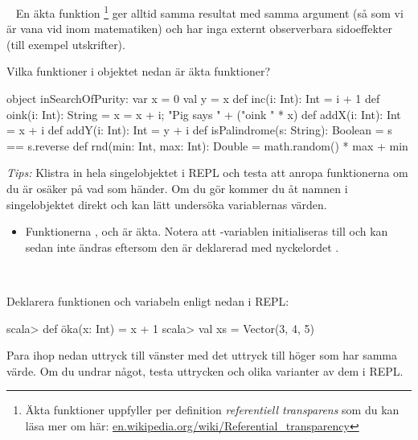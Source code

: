 
\QUESTBEGIN

\Task  \what~  En äkta funktion%
\footnote{Äkta funktioner uppfyller per definition  \textit{referentiell transparens}  som du kan läsa mer om här:  \href{https://en.wikipedia.org/wiki/Referential_transparency}{en.wikipedia.org/wiki/Referential\_transparency}}
 ger alltid samma resultat med samma argument (så som vi är vana vid inom matematiken) och har inga externt observerbara sidoeffekter (till exempel utskrifter).

Vilka funktioner i objektet  nedan är äkta funktioner?
\begin{Code}
object inSearchOfPurity:
  var x = 0
  val y = x
  def inc(i: Int): Int = i + 1
  def oink(i: Int): String = { x = x + i; "Pig says " + ("oink " * x) }
  def addX(i: Int): Int = x + i
  def addY(i: Int): Int = y + i
  def isPalindrome(s: String): Boolean = s == s.reverse
  def rnd(min: Int, max: Int): Double = math.random() * max + min
\end{Code}


\noindent\emph{Tips:} Klistra in hela singelobjektet i REPL och testa att anropa funktionerna om du är osäker på vad som händer. Om du gör  kommer du åt namnen i singelobjektet direkt och kan lätt undersöka variablernas värden.

\SOLUTION

\TaskSolved \what

\begin{itemize}
  \item Funktionerna  ,  och  är äkta. Notera att -variablen initialiseras till  och kan sedan inte ändras eftersom den är deklarerad med nyckelordet .
\end{itemize}

\QUESTEND



\QUESTBEGIN

\Task  \what~

\noindent Deklarera funktionen  och variabeln  enligt nedan i REPL:
\begin{REPL}
scala> def öka(x: Int) = x + 1
scala> val xs = Vector(3, 4, 5)
\end{REPL}
\noindent Para ihop nedan uttryck till vänster med det uttryck till höger som har samma värde. Om du undrar något, testa uttrycken och olika varianter av dem i REPL.

